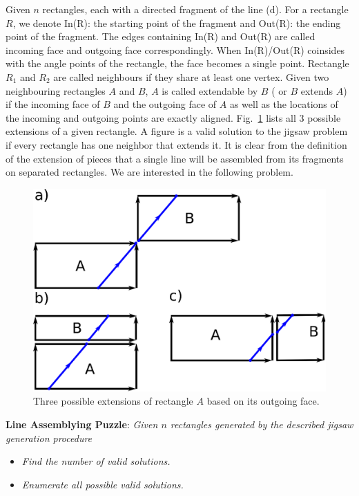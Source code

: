 \documentclass[a4paper]{article}
\begin{document}
Given $n$ rectangles, each with a directed fragment of the line (d). For a rectangle $R$, we denote In(R): 
    the starting point of the fragment and Out(R): the ending point of
the fragment. The edges containing In(R) and Out(R) are called incoming face and outgoing face correspondingly. When In(R)/Out(R) coinsides with the
angle points of the rectangle, the face becomes a single point.
Rectangle $R_1$ and $R_2$ are called neighbours if they share at least one vertex. Given two neighbouring rectangles $A$ and $B$, $A$ is
called extendable by $B$ ( or $B$ extends $A$) if the incoming face of $B$ and the outgoing face of $A$ as well as the locations of
the incoming and outgoing points are exactly aligned. Fig.~\ref{fig:basic} lists all 3 possible extensions of a given rectangle.
A figure is a valid solution to the jigsaw problem if every rectangle has one neighbor that extends it.
It is clear from the definition of the extension of pieces that a single line will be assembled from its fragments on separated rectangles.
We are interested in the following problem.
\begin{figure}
\begin{center}
\includegraphics[scale=0.3]{fig/basic.eps}
\end{center}
\label{fig:basic}
\caption{Three possible extensions of rectangle $A$ based on its outgoing face.}
\end{figure}

\textbf{Line Assemblying Puzzle}: \emph{Given $n$ rectangles generated by the described jigsaw generation procedure}
\begin{itemize}
\item \emph{Find the number of valid solutions.}
\item \emph{Enumerate all possible valid solutions.}
\end{itemize}
\end{document}
